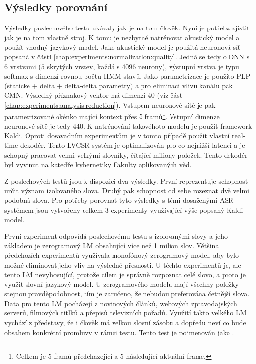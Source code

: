 \subsection{Výsledky porovnání}
\label{chap:experiments:normalization:comparison}

Výsledky poslechového testu ukázaly jak je na tom člověk. Nyní je potřeba zjistit jak je na tom vlastně stroj. K tomu je nezbytné natrénovat akustický model a použít vhodný jazykový model. Jako akustický model je použitá neuronová síť popsaná v části \ref{chap:experiments:normalization:quality}. Jedná se tedy o DNN s $6$ vrstvami ($5$ skrytých vrstev, každá s $4096$ neurony), výstupní vrstva je typu softmax s dimenzí rovnou počtu HMM stavů. Jako parametrizace je použito PLP (statické + delta + delta-delta parametry) a pro eliminaci vlivu kanálu pak CMN. Výsledný příznakový vektor má dimenzi $40$ (viz část \ref{chap:experiments:analysis:reduction}). Vstupem neuronové sítě je pak parametrizované okénko mající kontext přes $5$ framů\footnote{Celkem je $5$ framů předchazející a $5$ následující aktuální frame.}. Vstupní dimenze neuronové sítě je tedy $440$. K natrénování takovéhoto modelu je použit framework Kaldi. Oproti dosavadním experimentům je v tomto případě použit vlastní real-time dekodér. Tento LVCSR systém je optimalizován pro co nejnižší latenci a je schopný pracovat velmi velkými slovníky, čítající miliony položek. Tento dekodér byl vyvinut na katedře kybernetiky Fakulty aplikovaných věd.

Z poslechových testů jsou k dispozici dva výsledky. První reprezentuje schopnost určit význam izolovaného slova. Druhý pak schopnost od sebe rozeznat dvě velmi podobná slova. Pro potřeby porovnat tyto výsledky s těmi dosaženými ASR systémem jsou vytvořeny celkem $3$ experimenty využívající výše popsaný Kaldi model.

První experiment odpovídá poslechovému testu s izolovanými slovy a jeho základem je zerogramový LM obsahující více než 1 milion slov. Většina předchozích experimentů využívala monofónový zerogramový model, aby bylo možné eliminovat jeho vliv na výsledné přesnosti. U těchto experimentů je, ale tento LM nevyhovující, protože cílem je správně rozpoznat celé slovo, a proto je využit slovní jazykový model. U zerogramového modelu mají všechny položky stejnou pravděpodobnost, tím je zaručeno, že nebudou preferována četnější slova. Data pro tento LM pocházejí z novinových článků, webových zpravodajských serverů, filmových titlků a přepisů televizních pořadů. Využití takto velkého LM vychází z představy, že i člověk má velkou slovní zásobu a dopředu neví co bude obsahem konkrétní promluvy v rámci testu. Tento test je pojmenován jako .


